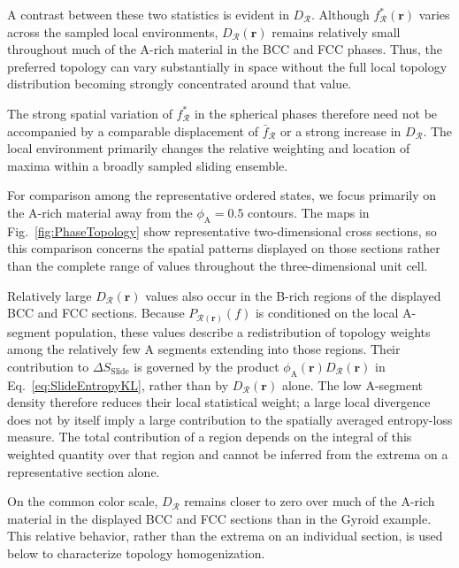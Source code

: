 \documentclass[journal=mamobx,manuscript=article]{achemso}
\begin{document}
	A contrast between these two statistics is evident in $D_{\mathcal R}$.
	Although $f_{\mathcal R}^\ast(\bm r)$ varies across the sampled local environments, $D_{\mathcal R}(\bm r)$ remains relatively small throughout much of the A-rich material in the BCC and FCC phases.
	Thus, the preferred topology can vary substantially in space without the full local topology distribution becoming strongly concentrated around that value.
	
	The strong spatial variation of $f_{\mathcal R}^\ast$ in the spherical phases therefore need not be accompanied by a comparable displacement of $\bar f_{\mathcal R}$ or a strong increase in $D_{\mathcal R}$.
	The local environment primarily changes the relative weighting and location of maxima within a broadly sampled sliding ensemble.
	


	For comparison among the representative ordered states, we focus primarily on the A-rich material away from the $\phi_{\mathrm A}=0.5$ contours.
	The maps in Fig.~\ref{fig:PhaseTopology} show representative two-dimensional cross sections, so this comparison concerns the spatial patterns displayed on those sections rather than the complete range of values throughout the three-dimensional unit cell.

	Relatively large $D_{\mathcal R}(\bm r)$ values also occur in the B-rich regions of the displayed BCC and FCC sections.
	Because $P_{\mathcal R(\bm r)}(f)$ is conditioned on the local A-segment population, these values describe a redistribution of topology weights among the relatively few A segments extending into those regions.
	Their contribution to $\Delta S_{\mathrm{Slide}}$ is governed by the product $\phi_{\mathrm A}(\bm r)D_{\mathcal R}(\bm r)$ in Eq.~\eqref{eq:SlideEntropyKL}, rather than by $D_{\mathcal R}(\bm r)$ alone.
	The low A-segment density therefore reduces their local statistical weight; a large local divergence does not by itself imply a large contribution to the spatially averaged entropy-loss measure.
	The total contribution of a region depends on the integral of this weighted quantity over that region and cannot be inferred from the extrema on a representative section alone.

	On the common color scale, $D_{\mathcal R}$ remains closer to zero over much of the A-rich material in the displayed BCC and FCC sections than in the Gyroid example.
	This relative behavior, rather than the extrema on an individual section, is used below to characterize topology homogenization.
\end{document}
